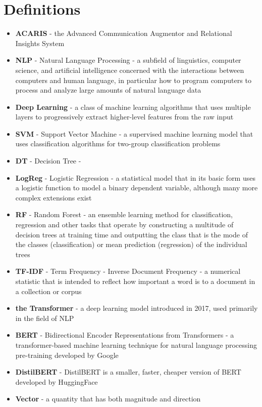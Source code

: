 \documentclass{article}
\begin{document}
\section{Definitions}
\begin{itemize}
	\item \textbf{ACARIS} - the Advanced Communication Augmentor and Relational Insights System
	\item \textbf{NLP} - Natural Language Processing - a subfield of linguistics, computer science, and artificial intelligence concerned with the interactions between computers and human language, in particular how to program computers to process and analyze large amounts of natural language data
	\item \textbf{Deep Learning} - a class of machine learning algorithms that uses multiple layers to progressively extract higher-level features from the raw input
	\item \textbf{SVM} - Support Vector Machine - a supervised machine learning model that uses classification algorithms for two-group classification problems
	\item \textbf{DT} - Decision Tree - 
	\item \textbf{LogReg} - Logistic Regression - a statistical model that in its basic form uses a logistic function to model a binary dependent variable, although many more complex extensions exist
	\item \textbf{RF} - Random Forest - an ensemble learning method for classification, regression and other tasks that operate by constructing a multitude of decision trees at training time and outputting the class that is the mode of the classes (classification) or mean prediction (regression) of the individual trees
	\item \textbf{TF-IDF} - Term Frequency - Inverse Document Frequency - a numerical statistic that is intended to reflect how important a word is to a document in a collection or corpus
	\item \textbf{the Transformer} - a deep learning model introduced in 2017, used primarily in the field of NLP
	\item \textbf{BERT} - Bidirectional Encoder Representations from Transformers - a transformer-based machine learning technique for natural language processing pre-training developed by Google
	\item \textbf{DistilBERT} - DistilBERT is a smaller, faster, cheaper version of BERT developed by HuggingFace
	\item \textbf{Vector} - a quantity that has both magnitude and direction

\end{itemize}
\end{document}
